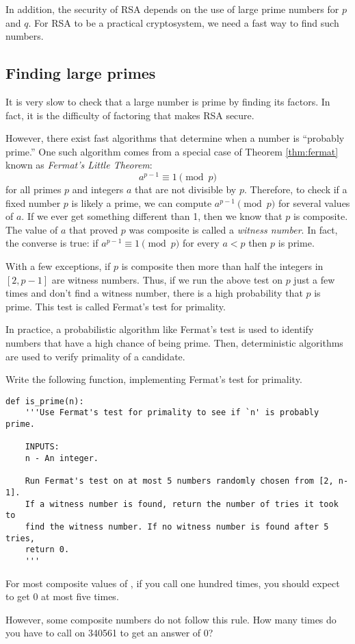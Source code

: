 In addition, the security of RSA depends on the use of large prime numbers for $p$ and $q$.
For RSA to be a practical cryptosystem, we need a fast way to find such numbers.


\subsection*{Finding large primes}
It is very slow to check that a large number is prime by finding its factors.
In fact, it is the difficulty of factoring that makes RSA secure.

However, there exist fast algorithms that determine when a number is ``probably prime.''
One such algorithm comes from a special case of Theorem \ref{thm:fermat} known as \emph{Fermat's Little Theorem}:
\[
a^{p-1} \equiv 1 \pmod{p}
\]
for all primes $p$ and integers $a$ that are not divisible by $p$.
Therefore, to check if a fixed number $p$ is likely a prime, we can compute $a^{p-1} \pmod{p}$ for several values of $a$.
If we ever get something different than 1, then we know that $p$ is composite.
The value of $a$ that proved $p$ was composite is called a \emph{witness number}.
In fact, the converse is true: if $a^{p-1} \equiv 1 \pmod{p}$ for every $a<p$ then $p$ is prime.

With a few exceptions, if $p$ is composite then more than half the integers in $[2, p-1]$ are witness numbers.
Thus, if we run the above test on $p$ just a few times and don't find a witness number, there is a high probability that $p$ is prime.
This test is called Fermat's test for primality.

In practice, a probabilistic algorithm like Fermat's test is used to identify numbers that have a high chance of being prime. 
Then, deterministic algorithms are used to verify primality of a candidate.

\begin{problem}
Write the following function, implementing Fermat's test for primality.
\begin{lstlisting}
def is_prime(n):
    '''Use Fermat's test for primality to see if `n' is probably prime.
    
    INPUTS:
    n - An integer.
    
    Run Fermat's test on at most 5 numbers randomly chosen from [2, n-1]. 
    If a witness number is found, return the number of tries it took to 
    find the witness number. If no witness number is found after 5 tries, 
    return 0.
    '''
\end{lstlisting}
For most composite values of , if you call  one hundred times, you should expect to get 0 at most five times.

However, some composite numbers do not follow this rule. 
How many times do you have to call  on 340561 to get an answer of 0?
\label{prob:prime_confidence}
\end{problem}







